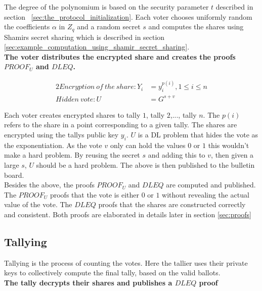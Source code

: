 \noindent
The degree of the polynomium is based on the security parameter $t$ described in section ~\ref{sec:the_protocol_initialization}. Each voter chooses uniformly random the coefficients $\alpha$ in $Z_q$ and a random secret $s$ and computes the shares using Shamirs secret sharing which is described in section \ref{sec:example_computation_using_shamir_secret_sharing}.\\

\noindent
\textbf{The voter distributes the encrypted share and creates the proofs $PROOF_U$ and $DLEQ$.}

\begin{alignat*}{2}
Encryption \ of \ the \ share : Y_i&=y_i^{p(i)} ,1\leq i\leq n \\ 
Hidden \ vote : U&=G^{s+v}
\end{alignat*}

\noindent
Each voter creates encrypted shares to tally $1$, tally $2$,..., tally $n$. The $p(i)$ refers to the share in a point corresponding to a given tally. The shares are encrypted using the tallys public key $y_i$. $U$ is a DL problem that hides the vote as the exponentiation. As the vote $v$ only can hold the values $0$ or $1$ this wouldn't make a hard problem. By reusing the secret $s$ and adding this to $v$, then given a large $s$, $U$ should be a hard problem. The above is then published to the bulletin board. \\

\noindent
Besides the above, the proofs $PROOF_U$ and $DLEQ$ are computed and published. The $PROOF_U$ proofs that the vote is either $0$ or $1$ without revealing the actual value of the vote. The $DLEQ$ proofs that the shares are constructed correctly and consistent. Both proofs are elaborated in details later in section \ref{sec:proofs}

\subsection{Tallying}
\label{sec:tallying}
Tallying is the process of counting the votes. Here the tallier uses their private keys to collectively compute the final tally, based on the valid ballots.\\



\noindent
\textbf{The tally decrypts their shares and publishes a $DLEQ$ proof}

